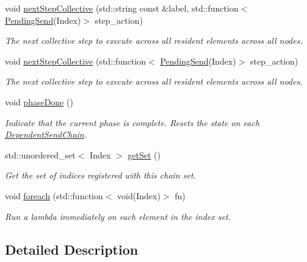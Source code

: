 \begin{DoxyCompactItemize}
void \hyperlink{classvt_1_1messaging_1_1_collection_chain_set_a095bc4907c3bd60668483de52b79b08e}{next\+Step\+Collective} (std\+::string const \&label, std\+::function$<$ \hyperlink{structvt_1_1messaging_1_1_pending_send}{Pending\+Send}(Index)$>$ step\+\_\+action)
\begin{DoxyCompactList}\small\item\em The next collective step to execute across all resident elements across all nodes. \end{DoxyCompactList}\item 
void \hyperlink{classvt_1_1messaging_1_1_collection_chain_set_a7d226984e696278b9ca7e539c974bab4}{next\+Step\+Collective} (std\+::function$<$ \hyperlink{structvt_1_1messaging_1_1_pending_send}{Pending\+Send}(Index)$>$ step\+\_\+action)
\begin{DoxyCompactList}\small\item\em The next collective step to execute across all resident elements across all nodes. \end{DoxyCompactList}\item 
void \hyperlink{classvt_1_1messaging_1_1_collection_chain_set_afcb749b22063068d060f35fdcd2320b3}{phase\+Done} ()
\begin{DoxyCompactList}\small\item\em Indicate that the current phase is complete. Resets the state on each {\ttfamily \hyperlink{classvt_1_1messaging_1_1_dependent_send_chain}{Dependent\+Send\+Chain}}. \end{DoxyCompactList}\item 
std\+::unordered\+\_\+set$<$ Index $>$ \hyperlink{classvt_1_1messaging_1_1_collection_chain_set_a17bcba0392b2ae7c68a3c3630b71ffa3}{get\+Set} ()
\begin{DoxyCompactList}\small\item\em Get the set of indices registered with this chain set. \end{DoxyCompactList}\item 
void \hyperlink{classvt_1_1messaging_1_1_collection_chain_set_a5768b5b636799860a63ab182a1e34c9a}{foreach} (std\+::function$<$ void(Index)$>$ fn)
\begin{DoxyCompactList}\small\item\em Run a lambda immediately on each element in the index set. \end{DoxyCompactList}\end{DoxyCompactItemize}


\subsection{Detailed Description}
